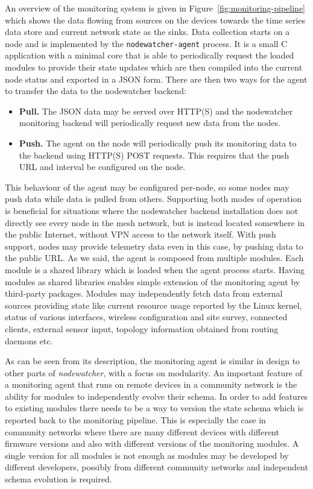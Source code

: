\documentclass[5p,sort&compress]{elsarticle}
\newcommand{\nodewatcher}{\textit{nodewatcher}}
\begin{document}
An overview of the monitoring system is given in Figure~\ref{fig:monitoring-pipeline} which shows the data flowing from sources on the devices towards the time series data store and current network state as the sinks.
Data collection starts on a node and is implemented by the \texttt{nodewatcher-agent} process.
It is a small C application with a minimal core that is able to periodically request the loaded modules to provide their state updates which are then compiled into the current node status and exported in a JSON form.
There are then two ways for the agent to transfer the data to the nodewatcher backend:
\begin{itemize}
    \item \textbf{Pull.} The JSON data may be served over HTTP(S) and the nodewatcher monitoring backend will periodically request new data from the nodes.

    \item \textbf{Push.} The agent on the node will periodically push its monitoring data to the backend using HTTP(S) POST requests. This requires that the push URL and interval be configured on the node.
\end{itemize}

This behaviour of the agent may be configured per-node, so some nodes may push data while data is pulled from others.
Supporting both modes of operation is beneficial for situations where the nodewatcher backend installation does not directly see every node in the mesh network, but is instead located somewhere in the public Internet, without VPN access to the network itself.
With push support, nodes may provide telemetry data even in this case, by pushing data to the public URL.
As we said, the agent is composed from multiple modules.
Each module is a shared library which is loaded when the agent process starts.
Having modules as shared libraries enables simple extension of the monitoring agent by third-party packages.
Modules may independently fetch data from external sources providing state like current resource usage reported by the Linux kernel, status of various interfaces, wireless configuration and site survey, connected clients, external sensor input, topology information obtained from routing daemons etc.

As can be seen from its description, the monitoring agent is similar in design to other parts of \nodewatcher{}, with a focus on modularity.
An important feature of a monitoring agent that runs on remote devices in a community network is the ability for modules to independently evolve their schema.
In order to add features to existing modules there needs to be a way to version the state schema which is reported back to the monitoring pipeline.
This is especially the case in community networks where there are many different devices with different firmware versions and also with different versions of the monitoring modules.
A single version for all modules is not enough as modules may be developed by different developers, possibly from different community networks and independent schema evolution is required.
\end{document}
